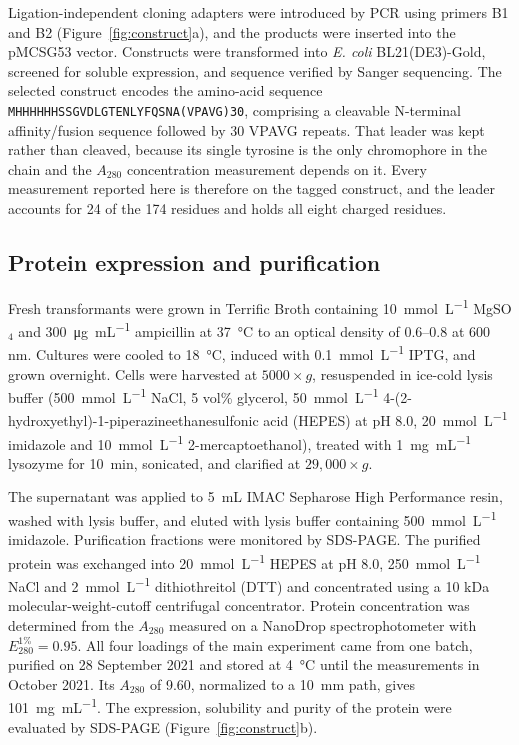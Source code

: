 \documentclass[11pt]{article}
\begin{document}
Ligation-independent cloning adapters were introduced by PCR using primers B1 and B2 (Figure~\ref{fig:construct}a), and the products were inserted into the pMCSG53 vector.\cite{Aslanidis1990-lm,Eschenfeldt2009-bi} Constructs were transformed into \textit{E. coli} BL21(DE3)-Gold, screened for soluble expression, and sequence verified by Sanger sequencing. The selected construct encodes the amino-acid sequence \texttt{MHHHHHHSSGVDLGTENLYFQSNA(VPAVG)30}, comprising a cleavable N-terminal affinity/fusion sequence followed by 30 VPAVG repeats. That leader was kept rather than cleaved, because its single tyrosine is the only chromophore in the chain and the $A_{280}$ concentration measurement depends on it. Every measurement reported here is therefore on the tagged construct, and the leader accounts for 24 of the 174 residues and holds all eight charged residues.

\subsection{Protein expression and purification}
Fresh transformants were grown in Terrific Broth containing \SI{10}{\milli\mole\per\liter} MgSO$_4$ and \SI{300}{\micro\gram\per\milli\liter} ampicillin at \SI{37}{\degreeCelsius} to an optical density of 0.6--0.8 at 600 nm. Cultures were cooled to \SI{18}{\degreeCelsius}, induced with \SI{0.1}{\milli\mole\per\liter} IPTG, and grown overnight. Cells were harvested at $5000\times g$, resuspended in ice-cold lysis buffer (\SI{500}{\milli\mole\per\liter} NaCl, 5 vol\% glycerol, \SI{50}{\milli\mole\per\liter} 4-(2-hydroxyethyl)-1-piperazineethanesulfonic acid (HEPES) at pH 8.0, \SI{20}{\milli\mole\per\liter} imidazole and \SI{10}{\milli\mole\per\liter} 2-mercaptoethanol), treated with \SI{1}{\milli\gram\per\milli\liter} lysozyme for \SI{10}{\minute}, sonicated, and clarified at $29{,}000\times g$.\cite{Makowska-Grzyska2014-cz}

The supernatant was applied to \SI{5}{\milli\liter} IMAC Sepharose High Performance resin, washed with lysis buffer, and eluted with lysis buffer containing \SI{500}{\milli\mole\per\liter} imidazole. Purification fractions were monitored by SDS-PAGE. The purified protein was exchanged into \SI{20}{\milli\mole\per\liter} HEPES at pH 8.0, \SI{250}{\milli\mole\per\liter} NaCl and \SI{2}{\milli\mole\per\liter} dithiothreitol (DTT) and concentrated using a 10 kDa molecular-weight-cutoff centrifugal concentrator. Protein concentration was determined from the $A_{280}$ measured on a NanoDrop spectrophotometer with $E^{1\%}_{280}=0.95$. All four loadings of the main experiment came from one batch, purified on 28 September 2021 and stored at \SI{4}{\degreeCelsius} until the measurements in October 2021. Its $A_{280}$ of 9.60, normalized to a \SI{10}{\milli\meter} path, gives \SI{101}{\milli\gram\per\milli\liter}. The expression, solubility and purity of the protein were evaluated by SDS-PAGE (Figure~\ref{fig:construct}b).
\end{document}
